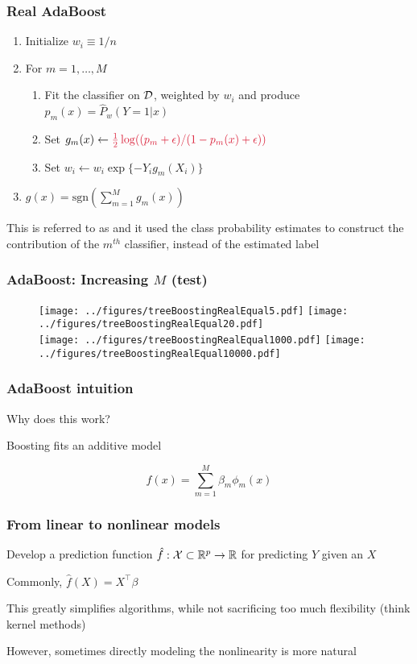 \documentclass[12pt]{beamer}
\begin{document}
\begin{frame}[fragile]
\frametitle{Real AdaBoost }
\begin{enumerate}
\item Initialize $w_i \equiv 1/n$
\item For $m = 1,\ldots,M$
\begin{enumerate}
\item Fit the classifier on $\mathcal{D}$, weighted by $w_i$ and produce $p_m(x) = \hat{P}_w(Y = 1 | x)$
\item Set $g_m(x) \leftarrow \alr{\frac{1}{2}\log( (p_m+\epsilon)/(1-p_m(x)+\epsilon))}$
\item Set $w_i \leftarrow w_i\exp\{-Y_i g_m(X_i)\}$
\end{enumerate}
\item {} $g(x) = \textrm{sgn}\left(\sum_{m=1}^M g_m(x)\right)$
\end{enumerate}
This is referred to as  and it used the class probability estimates to construct the
contribution of the $m^{th}$ classifier, instead of the estimated label
\end{frame}

\begin{frame}[fragile]
\frametitle{AdaBoost: Increasing $M$ (test)}
\begin{figure}
\texttt{[image: ../figures/treeBoostingRealEqual5.pdf]} 
\texttt{[image: ../figures/treeBoostingRealEqual20.pdf]} \\
\texttt{[image: ../figures/treeBoostingRealEqual1000.pdf]}
\texttt{[image: ../figures/treeBoostingRealEqual10000.pdf]}
\end{figure}
\end{frame}

\begin{frame}[fragile]
\frametitle{AdaBoost intuition}
 Why does this work?

\vsp
{} Boosting fits an additive model

\[
f(x) = \sum_{m=1}^M \beta_m \phi_m(x)
\]
\end{frame}

\begin{frame}[fragile]
\frametitle{From linear to nonlinear models}
 Develop a prediction function $\hat{f}: \mathcal{X} \subset \mathbb{R}^p \rightarrow \mathbb{R}$
for predicting $Y$ given an $X$

\vsp
Commonly, $\hat{f}(X) = X^{\top}\beta$ 


\vsp
This greatly simplifies algorithms, while not sacrificing too much flexibility (think kernel methods)

\vsp
However, sometimes directly modeling the nonlinearity is more natural
\end{frame}
\end{document}
